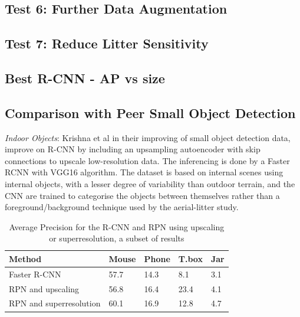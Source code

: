 \documentclass{IEEEtran}
\begin{document}
\subsection{Test 6: Further Data Augmentation}

\subsection{Test 7: Reduce Litter Sensitivity}

\subsection{Best R-CNN - AP vs size}

\subsection{Comparison with Peer Small Object Detection}

\textit{Indoor Objects}: Krishna et al \cite{Krishna} in their improving of small object detection data, improve on R-CNN by including an upsampling autoencoder with skip connections to upscale low-resolution data. The inferencing is done by a Faster RCNN with VGG16 algorithm. The dataset is based on internal scenes using internal objects, with a lesser degree of variability than outdoor terrain, and the CNN are trained to categorise the objects between themselves rather than a foreground/background technique used by the aerial-litter study.

\begin{table}[h]
\caption{Average Precision for the R-CNN and RPN using upscaling or superresolution, a subset of results}
\centering
\begin{tabular}{lllll}
\hline
\textbf{Method}                         & \textbf{Mouse}            & \textbf{Phone}            & \textbf{T.box}            & \textbf{Jar}             \\ \hline
\multicolumn{1}{|l|}{Faster R-CNN}      & \multicolumn{1}{l|}{57.7} & \multicolumn{1}{l|}{14.3} & \multicolumn{1}{l|}{8.1}  & \multicolumn{1}{l|}{3.1} \\ \hline
\multicolumn{1}{|l|}{RPN and upscaling} & \multicolumn{1}{l|}{56.8} & \multicolumn{1}{l|}{16.4} & \multicolumn{1}{l|}{23.4} & \multicolumn{1}{l|}{4.1} \\ \hline
RPN and superresolution                 & 60.1                      & 16.9                      & 12.8                      & 4.7                      \\ \hline
\end{tabular}
\end{table}
\end{document}
